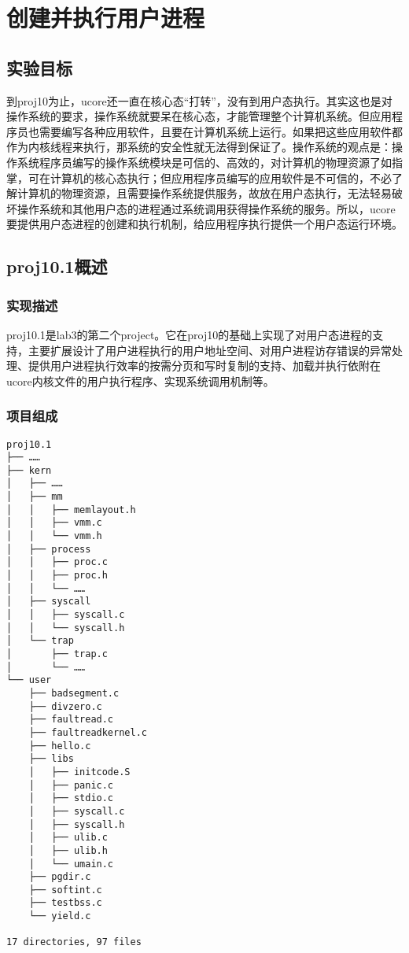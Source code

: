 \section{创建并执行用户进程}\label{ux521bux5efaux5e76ux6267ux884cux7528ux6237ux8fdbux7a0b}

\subsection{实验目标}\label{ux5b9eux9a8cux76eeux6807}

到proj10为止，ucore还一直在核心态``打转''，没有到用户态执行。其实这也是对操作系统的要求，操作系统就要呆在核心态，才能管理整个计算机系统。但应用程序员也需要编写各种应用软件，且要在计算机系统上运行。如果把这些应用软件都作为内核线程来执行，那系统的安全性就无法得到保证了。操作系统的观点是：操作系统程序员编写的操作系统模块是可信的、高效的，对计算机的物理资源了如指掌，可在计算机的核心态执行；但应用程序员编写的应用软件是不可信的，不必了解计算机的物理资源，且需要操作系统提供服务，故放在用户态执行，无法轻易破坏操作系统和其他用户态的进程通过系统调用获得操作系统的服务。所以，ucore要提供用户态进程的创建和执行机制，给应用程序执行提供一个用户态运行环境。

\subsection{proj10.1概述}\label{proj10.1ux6982ux8ff0}

\subsubsection{实现描述}\label{ux5b9eux73b0ux63cfux8ff0}

proj10.1是lab3的第二个project。它在proj10的基础上实现了对用户态进程的支持，主要扩展设计了用户进程执行的用户地址空间、对用户进程访存错误的异常处理、提供用户进程执行效率的按需分页和写时复制的支持、加载并执行依附在ucore内核文件的用户执行程序、实现系统调用机制等。

\subsubsection{项目组成}\label{ux9879ux76eeux7ec4ux6210}

\begin{lstlisting}
proj10.1
├── ……
├── kern
│   ├── ……
│   ├── mm
│   │   ├── memlayout.h
│   │   ├── vmm.c
│   │   └── vmm.h
│   ├── process
│   │   ├── proc.c
│   │   ├── proc.h
│   │   └── ……
│   ├── syscall
│   │   ├── syscall.c
│   │   └── syscall.h
│   └── trap
│       ├── trap.c
│       └── ……
└── user
    ├── badsegment.c
    ├── divzero.c
    ├── faultread.c
    ├── faultreadkernel.c
    ├── hello.c
    ├── libs
    │   ├── initcode.S
    │   ├── panic.c
    │   ├── stdio.c
    │   ├── syscall.c
    │   ├── syscall.h
    │   ├── ulib.c
    │   ├── ulib.h
    │   └── umain.c
    ├── pgdir.c
    ├── softint.c
    ├── testbss.c
    └── yield.c

17 directories, 97 files
\end{lstlisting}

